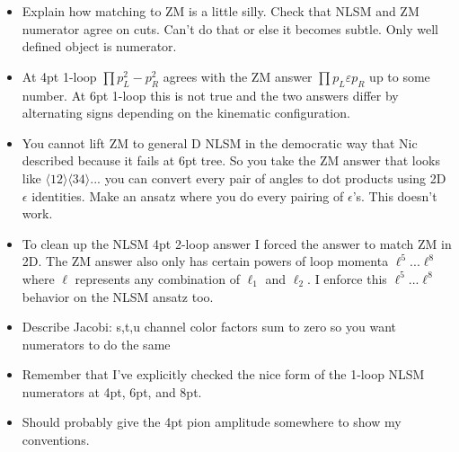\documentclass[11pt,letter]{article}
\def\eps{\varepsilon}
\begin{document}
\begin{itemize}
\item Explain how matching to ZM is a little silly.
Check that NLSM and ZM numerator agree on cuts.
Can't do that or else it becomes subtle.
Only well defined object is numerator.
\item At 4pt 1-loop $\prod p_L^2 -p_R^2$ agrees with the ZM answer $\prod p_L \eps p_R$ up to some number.
At 6pt 1-loop this is not true and the two answers differ by alternating signs depending on the kinematic configuration.
\item You cannot lift ZM to general D NLSM in the democratic way that Nic described because it fails at 6pt tree.  So you take the ZM answer that looks like $\langle 1 2\rangle \langle 3 4\rangle...$ you can convert every pair of angles to dot products using 2D $\epsilon$ identities.  Make an ansatz where you do every pairing of $\epsilon$'s.  This doesn't work.
\item To clean up the NLSM 4pt 2-loop answer I forced the answer to match ZM in 2D.
The ZM answer also only has certain powers of loop momenta $\ell^5$...$\ell^8$ where $\ell$ represents any combination of $\ell_1$ and $\ell_2$.
I enforce this $\ell^5$...$\ell^8$ behavior on the NLSM ansatz too.
\item Describe Jacobi:  s,t,u channel color factors sum to zero so you want numerators to do the same
\item Remember that I've explicitly checked the nice form of the 1-loop NLSM numerators at 4pt, 6pt, and 8pt.
\item Should probably give the 4pt pion amplitude somewhere to show my conventions.
\end{itemize}




\end{document}
